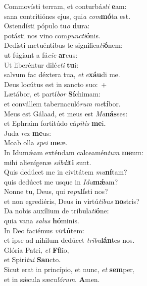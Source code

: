 \evenverse Commovísti terram, et conturbá\textit{sti} \textbf{e}am:~\*\\
\evenverse sana contritiónes ejus, qui\textit{a} \textit{com}\textbf{mó}ta est.\\
\oddverse Ostendísti pópulo tu\textit{o} \textbf{du}ra:~\*\\
\oddverse potásti nos vino com\textit{pun}\textit{cti}\textbf{ó}nis.\\
\evenverse Dedísti metuéntibus te significa\textit{ti}\textbf{ó}nem:~\*\\
\evenverse ut fúgiant a fá\textit{ci}\textit{e} \textbf{ar}cus:\\
\oddverse Ut liberéntur dilé\textit{cti} \textbf{tu}i:~\*\\
\oddverse salvum fac déxtera tua, \textit{et} \textit{e}\textbf{xáu}di me.\\
\evenverse Deus locútus est in sancto suo:~+\\
\evenverse  Lætábor, et partí\textit{bor} \textbf{Sí}chimam:~\*\\
\evenverse et convállem tabernaculó\textit{rum} \textit{me}\textbf{tí}bor.\\
\oddverse Meus est Gálaad, et meus est \textit{Ma}\textbf{nás}ses:~\*\\
\oddverse et Ephraim fortitúdo cá\textit{pi}\textit{tis} \textbf{me}i.\\
\evenverse Juda \textit{rex} \textbf{me}us:~\*\\
\evenverse Moab olla \textit{spe}\textit{i} \textbf{me}æ.\\
\oddverse In Idumǽam exténdam calceamén\textit{tum} \textbf{me}um:~\*\\
\oddverse mihi alienígenæ \textit{súb}\textit{di}\textbf{ti} sunt.\\
\evenverse Quis dedúcet me in civitátem \textit{mu}\textbf{ní}tam?~\*\\
\evenverse quis dedúcet me usque in \textit{I}\textit{du}\textbf{mǽ}am?\\
\oddverse Nonne tu, Deus, qui re\textit{pu}\textbf{lí}sti nos?~\*\\
\oddverse et non egrediéris, Deus in virtú\textit{ti}\textit{bus} \textbf{no}stris?\\
\evenverse Da nobis auxílium de tribula\textit{ti}\textbf{ó}ne:~\*\\
\evenverse quia vana \textit{sa}\textit{lus} \textbf{hó}minis.\\
\oddverse In Deo faciémus \textit{vir}\textbf{tú}tem:~\*\\
\oddverse et ipse ad níhilum dedúcet \textit{tri}\textit{bu}\textbf{lán}tes nos.\\
\evenverse Glória Patri, \textit{et} \textbf{Fí}lio,~\*\\
\evenverse et Spirí\textit{tu}\textit{i} \textbf{San}cto.\\
\oddverse Sicut erat in princípio, et nunc, \textit{et} \textbf{sem}per,~\*\\
\oddverse et in sǽcula sæcu\textit{ló}\textit{rum}. \textbf{A}men.\\
